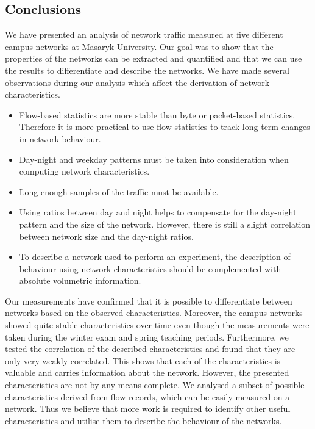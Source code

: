 \subsection{Conclusions} \label{subsec:characterization-conclusions}

We have presented an analysis of network traffic measured at five different campus networks at Masaryk University. Our goal was to show that the properties of the networks can be extracted and quantified and that we can use the results to differentiate and describe the networks. We have made several observations during our analysis which affect the derivation of network characteristics.

\begin{itemize}
    \setlength\itemsep{4pt}
    \item Flow-based statistics are more stable than byte or packet-based statistics. Therefore it is more practical to use flow statistics to track long-term changes in network behaviour.
    \item Day-night and weekday patterns must be taken into consideration when computing network characteristics.
    \item Long enough samples of the traffic must be available.
    \item Using ratios between day and night helps to compensate for the day-night pattern and the size of the network. However, there is still a slight correlation between network size and the day-night ratios.
    \item To describe a network used to perform an experiment, the description of behaviour using network characteristics should be complemented with absolute volumetric information.
\end{itemize}

Our measurements have confirmed that it is possible to differentiate between networks based on the observed characteristics. Moreover, the campus networks showed quite stable characteristics over time even though the measurements were taken during the winter exam and spring teaching periods. Furthermore, we tested the correlation of the described characteristics and found that they are only very weakly correlated. This shows that each of the characteristics is valuable and carries information about the network. However, the presented characteristics are not by any means complete. We analysed a subset of possible characteristics derived from flow records, which can be easily measured on a network. Thus we believe that more work is required to identify other useful characteristics and utilise them to describe the behaviour of the networks.


